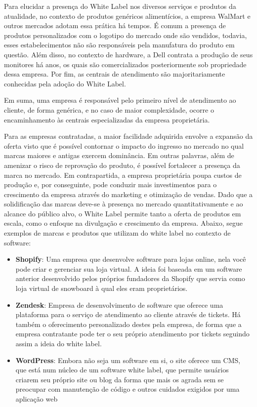 \documentclass[12pt,twoside,english,brazilian]{article}
\begin{document}
Para elucidar a presença do White Label nos diversos serviços e produtos da atualidade, no contexto de produtos genéricos alimentícios, a empresa WalMart e outros mercados adotam essa prática há tempos. É comum a presença de produtos personalizados com o logotipo do mercado onde são vendidos, todavia, esses estabelecimentos não são responsáveis pela manufatura do produto em questão. Além disso, no contexto de hardware, a Dell contrata a produção de seus monitores há anos, os quais são comercializados posteriormente sob propriedade dessa empresa. Por fim, as centrais de atendimento são majoritariamente conhecidas pela adoção do White Label.

Em suma, uma empresa é responsável pelo primeiro nível de atendimento ao cliente, de forma genérica, e no caso de maior complexidade, ocorre o encaminhamento às centrais especializadas da empresa proprietária.

Para as empresas contratadas, a maior facilidade adquirida envolve a expansão da oferta visto que é possível contornar o impacto do ingresso no mercado no qual marcas maiores e antigas exercem dominância. Em outras palavras, além de amenizar o risco de reprovação do produto, é possível fortalecer a presença da marca no mercado. Em contrapartida, a empresa proprietária poupa custos de produção e, por conseguinte, pode conduzir mais investimentos para o crescimento da empresa através do marketing e otimização de vendas. 
Dado que a solidificação das marcas deve-se à presença no mercado quantitativamente e ao alcance do público alvo, o White Label permite tanto a oferta de produtos em escala, como o enfoque na divulgação e crescimento da empresa. Abaixo, segue exemplos de marcas e produtos que utilizam do white label no contexto de software:

\begin{itemize}
    \item {\bfseries Shopify}: Uma empresa que desenvolve software para lojas online, nela você pode criar e gerenciar sua loja virtual. A ideia foi baseada em um software anterior desenvolvido pelos próprios fundadores da Shopify que servia como loja virtual de snowboard à qual eles eram proprietários.

    \item {\bfseries Zendesk}: Empresa de desenvolvimento de software que oferece uma plataforma para o serviço de atendimento ao cliente através de tickets. Há também o oferecimento personalizado destes pela empresa, de forma que a empresa contratante pode ter o seu próprio atendimento por tickets seguindo assim a ideia do white label.

    \item {\bfseries WordPress}: Embora não seja um software em si, o site oferece um CMS, que está num núcleo de um software white label, que permite usuários criarem seu próprio site ou blog da forma que mais os agrada sem se preocupar com manutenção de código e outros cuidados exigidos por uma aplicação web
\end{itemize}
\end{document}
